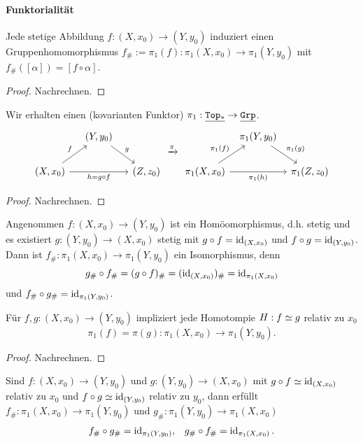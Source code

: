 \paragraph{Funktorialität}

\begin{lem}
	Jede stetige Abbildung $f: (X, x_0) \to (Y, y_0)$ induziert einen Gruppenhomomorphismus $f_\# := \pi_1(f) : \pi_1(X, x_0) \to \pi_1(Y, y_0)$ mit $f_\#([\alpha]) = [f \circ \alpha]$.
	\begin{proof}
		Nachrechnen.
	\end{proof}
\end{lem}

\begin{st}
	Wir erhalten einen (kovarianten Funktor) $\pi_1: \underline{\mathtt{Top_*}} \to \underline{\mathtt{Grp}}$.
	\[
		\begin{tikzcd}[column sep=small]
			~ & (Y,y_0) \arrow{dr}{g} & \\
			(X,x_0) \arrow{ur}{f} \arrow{rr}[swap]{h=g \circ f} & & (Z, z_0)
		\end{tikzcd}
		\xrightarrow{\pi}
		\begin{tikzcd}[column sep=tiny]
			~ & \pi_1(Y, y_0) \arrow{dr}{\pi_1(g)} & \\
			\pi_1(X,x_0) \arrow{ur}{\pi_1(f)} \arrow{rr}[swap]{\pi_1(h)} & & \pi_1(Z,z_0)
		\end{tikzcd}
	\]
	\begin{proof}
		Nachrechnen.
	\end{proof}
\end{st}


\begin{kor}
	Angenommen $f: (X, x_0) \to (Y, y_0)$ ist ein Homöomorphismus, d.h. stetig und es existiert $g: (Y, y_0) \to (X, x_0)$ stetig mit $g \circ f = \operatorname{id}_{(X,x_0)}$ und $f\circ g = \operatorname{id}_{(Y,y_0)}$.
	Dann ist $f_\# : \pi_1(X, x_0) \to \pi_1(Y,y_0)$ ein Isomorphismus, denn
	\[
		g_\# \circ f_\# = (g \circ f)_\# = (\operatorname{id}_{(X, x_0)})_\# = \operatorname{id}_{\pi_1(X, x_0)}
	\]
	und $f_\# \circ g_\# = \operatorname{id}_{\pi_1(Y,y_0)}$.
\end{kor}

\begin{st}
	Für $f, g: (X, x_0) \to (Y, y_0)$ impliziert jede Homotompie $H: f \simeq g$ relativ zu $x_0$
	\[
		\pi_1(f) = \pi(g) : \pi_1(X, x_0) \to \pi_1(Y, y_0).
	\]
	\begin{proof}
		Nachrechnen.
	\end{proof}
\end{st}

\begin{kor}
	Sind $f: (X, x_0) \to (Y, y_0)$ und $g: (Y, y_0) \to (X, x_0)$ mit $g \circ f \simeq \operatorname{id}_{(X, x_0)}$ relativ zu $x_0$ und $f \circ g \simeq \operatorname{id}_{(Y, y_0)}$ relativ zu $y_0$, dann erfüllt $f_\#: \pi_1(X, x_0) \to \pi_1(Y, y_0)$ und $g_\# : \pi_1(Y, y_0) \to \pi_1(X, x_0)$
	\begin{align*}
		f_\# \circ g_\# &= \operatorname{id}_{\pi_1(Y, y_0)}, & g_\# \circ f_\# = \operatorname{id}_{\pi_1(X, x_0)}.
	\end{align*}
\end{kor}


